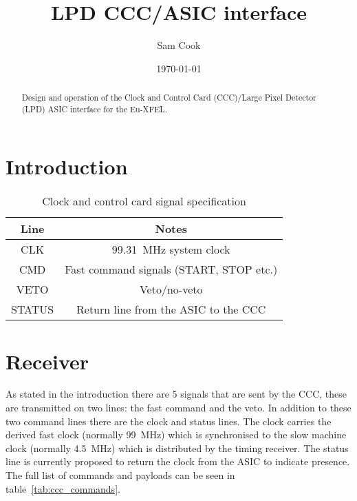 \documentclass[]{article}
\title{LPD CCC/ASIC interface}
\author{ Sam Cook }
\date{\today}
\begin{document}
	\ifpdf
	\else
	\fi

	\maketitle

	\begin{abstract}
		Design and operation of the Clock and Control Card (CCC)/Large Pixel Detector (LPD) ASIC interface for the Eu-XFEL.
	\end{abstract}
	\section{Introduction} %
	\label{sec:introduction}
	
	\begin{table}
		\begin{center}
			\begin{tabular}{c|c}
				Line & Notes \\
				\hline
				CLK    & 99.31~MHz system clock \\
				CMD    & Fast command signals (START, STOP etc.) \\
				VETO   & Veto/no-veto \\
				STATUS & Return line from the ASIC to the CCC \\
			\end{tabular}
		\end{center}
		\caption{Clock and control card signal specification}
		\label{tab:ccc_spec}
	\end{table}

	\section{Receiver} %
	\label{sec:receiver}
	As stated in the introduction there are 5 signals that are sent by the CCC, these are transmitted on two lines: the fast command and the veto. In addition to these two command lines there are the clock and status lines. The clock carries the derived fast clock (normally 99~MHz) which is synchronised to the slow machine clock (normally 4.5~MHz) which is distributed by the timing receiver. The status line is currently proposed to return the clock from the ASIC to indicate presence. The full list of commands and payloads can be seen in table~\ref{tab:ccc_commands}.
	
\end{document}

